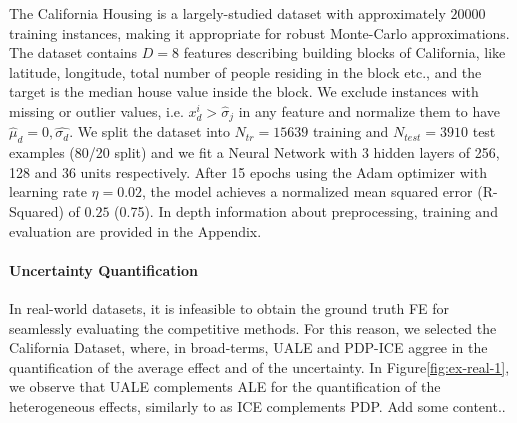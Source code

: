 \documentclass[twoside]{article}
\begin{document}
The California Housing is a largely-studied dataset with approximately
\(20000\) training instances, making it appropriate for robust
Monte-Carlo approximations. The dataset contains \(D=8\) features
describing building blocks of California, like latitude, longitude,
total number of people residing in the block etc., and the target is
the median house value inside the block. We exclude instances with
missing or outlier values, i.e. \(x_d^i > \hat{\sigma}_j\) in any
feature and normalize them to have
\(\hat{\mu}_d = 0, \hat{\sigma_d}\). We split the dataset into
\(N_{tr} = 15639\) training and \(N_{test} = 3910\) test examples (80/20
split) and we fit a Neural Network with 3 hidden layers of 256, 128
and 36 units respectively. After 15 epochs using the Adam optimizer
with learning rate \(\eta = 0.02\), the model achieves a normalized
mean squared error (R-Squared) of \(0.25\) (0.75). In depth
information about preprocessing, training and evaluation are provided
in the Appendix.

\paragraph{Uncertainty Quantification}

In real-world datasets, it is infeasible to obtain the ground truth FE
for seamlessly evaluating the competitive methods. For this reason, we
selected the California Dataset, where, in broad-terms, UALE and
PDP-ICE aggree in the quantification of the average effect and of the
uncertainty. In Figure\ref{fig:ex-real-1}, we observe that UALE
complements ALE for the quantification of the heterogeneous effects,
similarly to as ICE complements PDP. Add some content..
\end{document}
